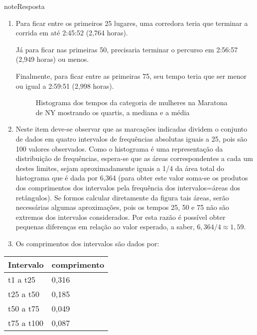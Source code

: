 \begin{sphinxadmonition}{note}{Resposta}
\begin{enumerate}
\item {} 
Para ficar entre os primeiros 25 lugares, uma corredora teria que terminar a corrida em até 2:45:52 (2,764 horas).

Já para ficar nas primeiras 50, precisaria terminar o percurso em 2:56:57 (2,949 horas) ou menos.

Finalmente, para ficar entre as primeiras 75, seu tempo teria que ser menor ou igual a 2:59:51 (2,998 horas).

\begin{figure}[H]
\centering
\capstart

\noindent{}
\caption{Histograma dos tempos da categoria de mulheres na Maratona de NY mostrando os quartis, a mediana e a média}\label{\detokenize{PE104-0:id18}}\end{figure}

\item {} 
Neste item deve-se observar que as marcações indicadas dividem o conjunto de dados em quatro intervalos de frequências absolutas iguais a 25, pois são 100 valores observados. Como o histograma é uma representação da distribuição de frequências, espera-se que as áreas correspondentes a cada um destes limites, sejam aproximadamente iguais a 1/4 da área total do histograma que é dada por 6,364 (para obter este valor soma-se os produtos dos comprimentos dos intervalos pela frequência dos intervalos=áreas dos retângulos). Se formos calcular diretamente da figura tais áreas, serão necessárias algumas aproximações, pois os tempos 25, 50 e 75 não são extremos dos intervalos considerados. Por esta razão é possível obter pequenas diferenças em relação ao valor esperado, a saber, \(6,364/4\approx 1,59\).

\item {} 
Os comprimentos dos intervalos são dados por:

\end{enumerate}


\begin{savenotes}\sphinxattablestart
\centering
\begin{tabulary}{\linewidth}[t]{|T|T|}
\hline

Intervalo
&
comprimento
\\
\hline
t1 a t25
&
0,316
\\
\hline
t25 a t50
&
0,185
\\
\hline
t50 a t75
&
0,049
\\
\hline
t75 a t100
&
0,087
\\
\hline
\end{tabulary}
\par
\sphinxattableend\end{savenotes}


\end{sphinxadmonition}
